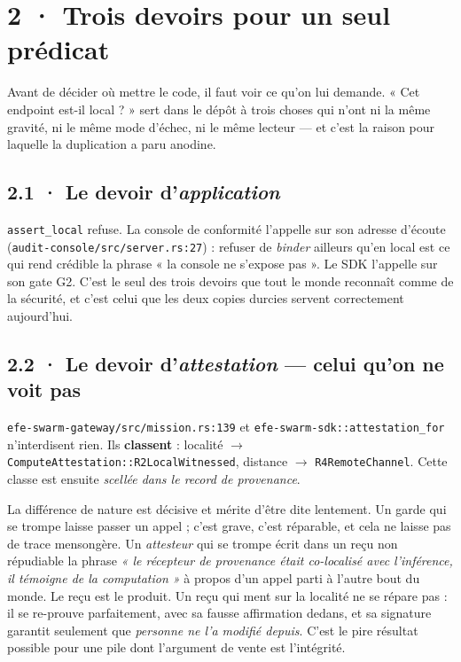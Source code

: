 \documentclass[10pt]{article}
\newcommand{\code}[1]{\texttt{\small #1}}
\newcommand{\fl}{$\rightarrow$}
\begin{document}
\section{2 · Trois devoirs pour un seul prédicat}

Avant de décider où mettre le code, il faut voir ce qu'on lui demande. « Cet endpoint est-il local ? »
sert dans le dépôt à trois choses qui n'ont ni la même gravité, ni le même mode d'échec, ni le même
lecteur --- et c'est la raison pour laquelle la duplication a paru anodine.

\subsection{2.1 · Le devoir d'\emph{application}}

\code{assert\_local} refuse. La console de conformité l'appelle sur son adresse d'écoute
(\code{audit-console/src/server.rs:27}) : refuser de \emph{binder} ailleurs qu'en local est ce qui
rend crédible la phrase « la console ne s'expose pas ». Le SDK l'appelle sur son gate G2. C'est le
seul des trois devoirs que tout le monde reconnaît comme de la sécurité, et c'est celui que les deux
copies durcies servent correctement aujourd'hui.

\subsection{2.2 · Le devoir d'\emph{attestation} --- celui qu'on ne voit pas}

\code{efe-swarm-gateway/src/mission.rs:139} et \code{efe-swarm-sdk::attestation\_for} n'interdisent
rien. Ils \textbf{classent} : localité \fl{} \code{ComputeAttestation::R2LocalWitnessed}, distance
\fl{} \code{R4RemoteChannel}. Cette classe est ensuite \emph{scellée dans le record de provenance}.

La différence de nature est décisive et mérite d'être dite lentement. Un garde qui se trompe laisse
passer un appel ; c'est grave, c'est réparable, et cela ne laisse pas de trace mensongère. Un
\emph{attesteur} qui se trompe écrit dans un reçu non répudiable la phrase \emph{« le récepteur de
provenance était co-localisé avec l'inférence, il témoigne de la computation »} à propos d'un appel
parti à l'autre bout du monde. Le reçu est le produit. Un reçu qui ment sur la localité ne se répare
pas : il se re-prouve parfaitement, avec sa fausse affirmation dedans, et sa signature garantit
seulement que \emph{personne ne l'a modifié depuis}. C'est le pire résultat possible pour une pile
dont l'argument de vente est l'intégrité.
\end{document}
